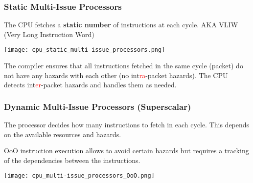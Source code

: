 \subsubsection{Static Multi-Issue Processors}
The CPU fetches a \textbf{static number} of instructions at each cycle. AKA VLIW (Very Long Instruction Word)

\texttt{[image: cpu\_static\_multi-issue\_processors.png]}

The compiler ensures that all instructions fetched in the same cycle (packet) do not have any hazards with each other (no int\textcolor{red}{ra}-packet hazards). The CPU detects int\textcolor{red}{er}-packet hazards and handles them as needed.

\subsubsection{Dynamic Multi-Issue Processors (Superscalar)}
The processor decides how many instructions to fetch in each cycle. This depends on the available resources and hazards.
\newpar{}

OoO instruction execution allows to avoid certain hazards but requires a tracking of the dependencies between the instructions.
\begin{center}
    \texttt{[image: cpu\_multi-issue\_processors\_OoO.png]}
\end{center}